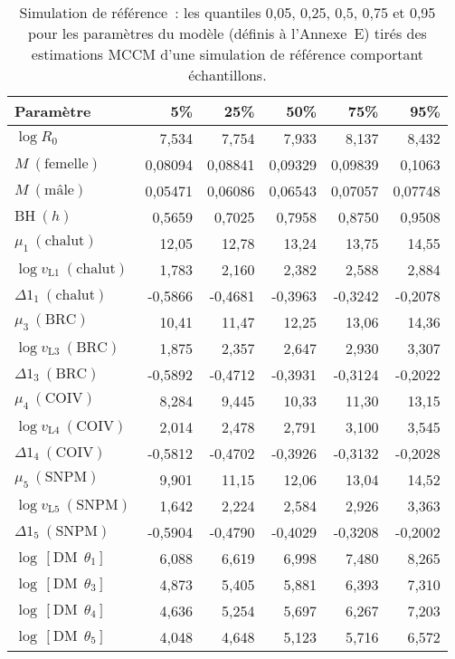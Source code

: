 \documentclass[11pt]{book}
\newcommand{\AppEqn}{Annexe~E}
\begin{document}
\setlength{\tabcolsep}{6pt}
\begin{table}[ht]
\centering
\caption{ Simulation de r\'{e}f\'{e}rence~: les quantiles 0,05, 0,25, 0,5, 0,75 et 0,95 pour les param\`{e}tres du mod\`{e}le (d\'{e}finis \`{a} l'\AppEqn) tir\'{e}s des estimations MCCM d'une simulation de r\'{e}f\'{e}rence comportant \Nbase{} \'{e}chantillons.} 
\label{tab:car.base.pars}
\begin{tabular}{lrrrrr}
  \\[-1.0ex] \hline
Param\`{e}tre & 5\% & 25\% & 50\% & 75\% & 95\% \\ 
  \hline
$\log R_{0}$ & 7,534 & 7,754 & 7,933 & 8,137 & 8,432 \\ 
  $M~(\text{femelle})$ & 0,08094 & 0,08841 & 0,09329 & 0,09839 & 0,1063 \\ 
  $M~(\text{m\^{a}le})$ & 0,05471 & 0,06086 & 0,06543 & 0,07057 & 0,07748 \\ 
  $\text{BH}~(h)$ & 0,5659 & 0,7025 & 0,7958 & 0,8750 & 0,9508 \\ 
  $\mu_{1}~(\text{chalut})$ & 12,05 & 12,78 & 13,24 & 13,75 & 14,55 \\ 
  $\log v_{\text{L}1}~(\text{chalut})$ & 1,783 & 2,160 & 2,382 & 2,588 & 2,884 \\ 
  $\Delta1_{1}~(\text{chalut})$ & -0,5866 & -0,4681 & -0,3963 & -0,3242 & -0,2078 \\ 
  $\mu_{3}~(\text{BRC})$ & 10,41 & 11,47 & 12,25 & 13,06 & 14,36 \\ 
  $\log v_{\text{L}3}~(\text{BRC})$ & 1,875 & 2,357 & 2,647 & 2,930 & 3,307 \\ 
  $\Delta1_{3}~(\text{BRC})$ & -0,5892 & -0,4712 & -0,3931 & -0,3124 & -0,2022 \\ 
  $\mu_{4}~(\text{COIV})$ & 8,284 & 9,445 & 10,33 & 11,30 & 13,15 \\ 
  $\log v_{\text{L}4}~(\text{COIV})$ & 2,014 & 2,478 & 2,791 & 3,100 & 3,545 \\ 
  $\Delta1_{4}~(\text{COIV})$ & -0,5812 & -0,4702 & -0,3926 & -0,3132 & -0,2028 \\ 
  $\mu_{5}~(\text{SNPM})$ & 9,901 & 11,15 & 12,06 & 13,04 & 14,52 \\ 
  $\log v_{\text{L}5}~(\text{SNPM})$ & 1,642 & 2,224 & 2,584 & 2,926 & 3,363 \\ 
  $\Delta1_{5}~(\text{SNPM})$ & -0,5904 & -0,4790 & -0,4029 & -0,3208 & -0,2002 \\ 
  $\log\,[\text{DM}~~\theta_1]$ & 6,088 & 6,619 & 6,998 & 7,480 & 8,265 \\ 
  $\log\,[\text{DM}~~\theta_3]$ & 4,873 & 5,405 & 5,881 & 6,393 & 7,310 \\ 
  $\log\,[\text{DM}~~\theta_4]$ & 4,636 & 5,254 & 5,697 & 6,267 & 7,203 \\ 
  $\log\,[\text{DM}~~\theta_5]$ & 4,048 & 4,648 & 5,123 & 5,716 & 6,572 \\ 
   \hline
\end{tabular}
\end{table}
\setlength{\tabcolsep}{6pt}
\clearpage
\end{document}
